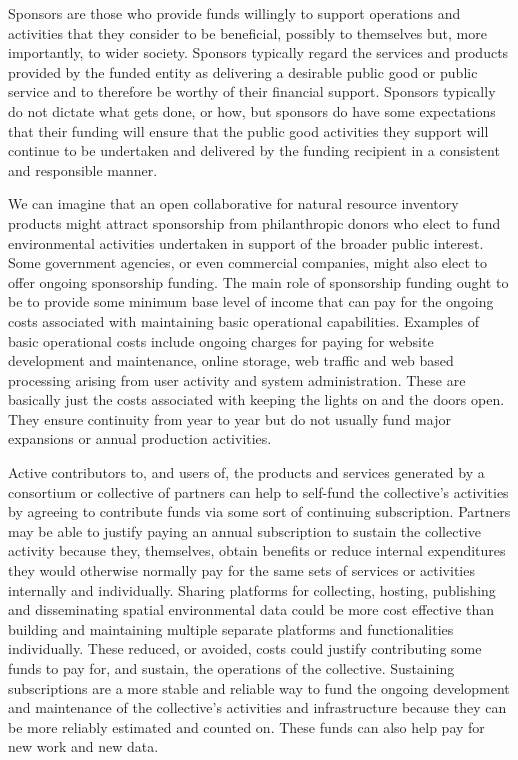 \documentclass[graybox,natbib,nospthms,UStrade]{svmono}
\begin{document}
Sponsors are those who provide funds willingly to support operations and
activities that they consider to be beneficial, possibly to themselves
but, more importantly, to wider society. Sponsors typically regard the
services and products provided by the funded entity as delivering a
desirable public good or public service and to therefore be worthy of
their financial support. Sponsors typically do not dictate what gets
done, or how, but sponsors do have some expectations that their funding
will ensure that the public good activities they support will continue
to be undertaken and delivered by the funding recipient in a consistent
and responsible manner.

We can imagine that an open collaborative for natural resource inventory
products might attract sponsorship from philanthropic donors who elect
to fund environmental activities undertaken in support of the broader
public interest. Some government agencies, or even commercial companies,
might also elect to offer ongoing sponsorship funding. The main role of
sponsorship funding ought to be to provide some minimum base level of
income that can pay for the ongoing costs associated with maintaining
basic operational capabilities. Examples of basic operational costs
include ongoing charges for paying for website development and
maintenance, online storage, web traffic and web based processing
arising from user activity and system administration. These are
basically just the costs associated with keeping the lights on and the
doors open. They ensure continuity from year to year but do not usually
fund major expansions or annual production activities.

Active contributors to, and users of, the products and services
generated by a consortium or collective of partners can help to
self-fund the collective's activities by agreeing to contribute funds
via some sort of continuing subscription. Partners may be able to
justify paying an annual subscription to sustain the collective activity
because they, themselves, obtain benefits or reduce internal
expenditures they would otherwise normally pay for the same sets of
services or activities internally and individually. Sharing platforms
for collecting, hosting, publishing and disseminating spatial
environmental data could be more cost effective than building and
maintaining multiple separate platforms and functionalities
individually. These reduced, or avoided, costs could justify
contributing some funds to pay for, and sustain, the operations of the
collective. Sustaining subscriptions are a more stable and reliable way
to fund the ongoing development and maintenance of the collective's
activities and infrastructure because they can be more reliably
estimated and counted on. These funds can also help pay for new work and
new data.
\end{document}
